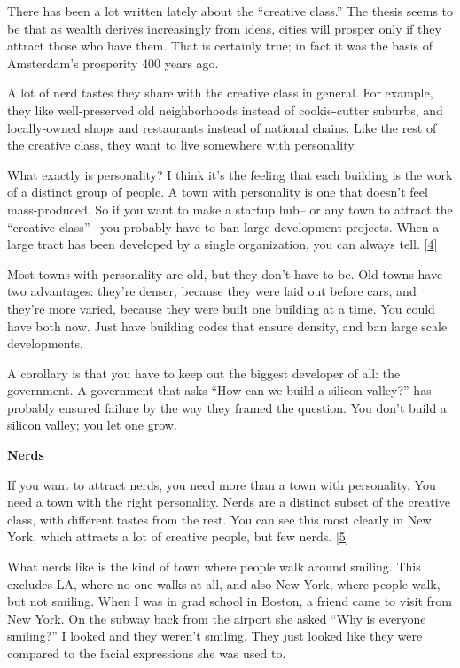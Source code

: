 There has been a lot written lately about the ``creative class.'' The
thesis seems to be that as wealth derives increasingly from ideas,
cities will prosper only if they attract those who have them. That is
certainly true; in fact it was the basis of Amsterdam's prosperity 400
years ago.

A lot of nerd tastes they share with the creative class in general. For
example, they like well-preserved old neighborhoods instead of
cookie-cutter suburbs, and locally-owned shops and restaurants instead
of national chains. Like the rest of the creative class, they want to
live somewhere with personality.

What exactly is personality? I think it's the feeling that each building
is the work of a distinct group of people. A town with personality is
one that doesn't feel mass-produced. So if you want to make a startup
hub-- or any town to attract the ``creative class''-- you probably have
to ban large development projects. When a large tract has been developed
by a single organization, you can always tell. {[}\hyperref[f4n]{4}{]}

Most towns with personality are old, but they don't have to be. Old
towns have two advantages: they're denser, because they were laid out
before cars, and they're more varied, because they were built one
building at a time. You could have both now. Just have building codes
that ensure density, and ban large scale developments.

A corollary is that you have to keep out the biggest developer of all:
the government. A government that asks ``How can we build a silicon
valley?'' has probably ensured failure by the way they framed the
question. You don't build a silicon valley; you let one grow.

\textbf{Nerds}

If you want to attract nerds, you need more than a town with
personality. You need a town with the right personality. Nerds are a
distinct subset of the creative class, with different tastes from the
rest. You can see this most clearly in New York, which attracts a lot of
creative people, but few nerds. {[}\hyperref[f5n]{5}{]}

What nerds like is the kind of town where people walk around smiling.
This excludes LA, where no one walks at all, and also New York, where
people walk, but not smiling. When I was in grad school in Boston, a
friend came to visit from New York. On the subway back from the airport
she asked ``Why is everyone smiling?'' I looked and they weren't
smiling. They just looked like they were compared to the facial
expressions she was used to.


